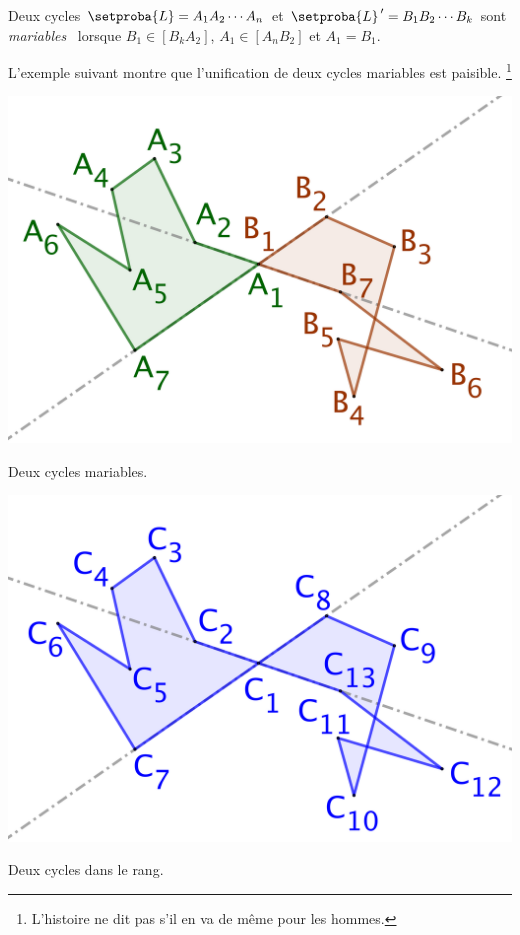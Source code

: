 

\begin{defi}
    Deux cycles
    $\setproba{L} = A_1 A_2 \cdots A_n$ 
    et
    $\setproba{L}^{\,\prime} = B_1 B_2 \cdots B_k$ 
    sont \og \emph{mariables} \fg\ lorsque
    $B_1 \in [B_k A_2]$,
    $A_1 \in [A_n B_2]$
    et
    $A_1 = B_1$.
\end{defi}


L'exemple suivant montre que l'unification de deux cycles mariables est paisible.%
\footnote{
	L'histoire ne dit pas s'il en va de même pour les hommes.
}

\begin{multicols}{2}
    \small\itshape
    \begin{center}
        \includegraphics[scale=.4]{content/polygon/at-least-one/wedding-1.png}

        \smallskip
        Deux cycles mariables.
    \end{center}


    \begin{center}
        \includegraphics[scale=.4]{content/polygon/at-least-one/wedding-2.png}

        \smallskip
        Deux cycles dans le rang.
    \end{center}
\end{multicols}
    
